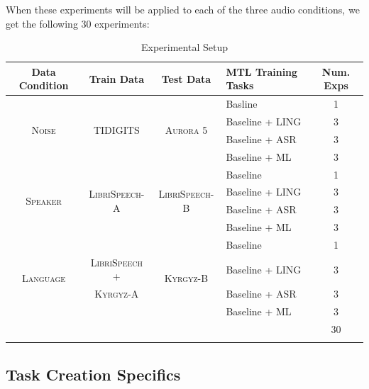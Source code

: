 \documentclass[10pt,a4paper]{article}
\begin{document}
When these experiments will be applied to each of the three audio conditions, we get the following 30 experiments:

\begin{table}[htbp]
  \centering
  \begin{adjustbox}{width=.95\textwidth}
    \begin{tabular}{ccclc}
      \toprule
      \textbf{Data Condition} & \textbf{Train Data} & \textbf{Test Data} & \textbf{MTL Training Tasks} & \textbf{Num. Exps} \\
      \midrule
      \multirow{4}{*}{\textsc{Noise}} & \multirow{4}{*}{\textsc{TIDIGITS}} & \multirow{4}{*}{\textsc{Aurora 5}} & Basline & 1\\
      & & & Baseline + LING & 3   \\
      & & & Baseline + ASR  & 3  \\
      & & & Baseline + ML   & 3  \\
      \midrule
      \multirow{4}{*}{\textsc{Speaker}} & \multirow{4}{*}{\textsc{LibriSpeech-A}} & \multirow{4}{*}{\textsc{LibriSpeech-B}} & Baseline & 1 \\
      & & & Baseline + LING & 3  \\
      & & & Baseline + ASR  & 3  \\
      & & & Baseline + ML   & 3  \\     \midrule
      \multirow{4}{*}{\textsc{Language}} & & \multirow{4}{*}{\textsc{Kyrgyz-B}} & Baseline & 1\\
      & \textsc{LibriSpeech +} & & Baseline + LING  & 3 \\
      &  \textsc{Kyrgyz-A} & & Baseline + ASR   & 3 \\
      & & & Baseline + ML & 3 \\
      \midrule
      &&&& 30\\
      \bottomrule\\
    \end{tabular}
    \label{table:data}
  \end{adjustbox}
  
  \caption{Experimental Setup}
  
\end{table}


\newpage

\subsection{Task Creation Specifics}
\end{document}
